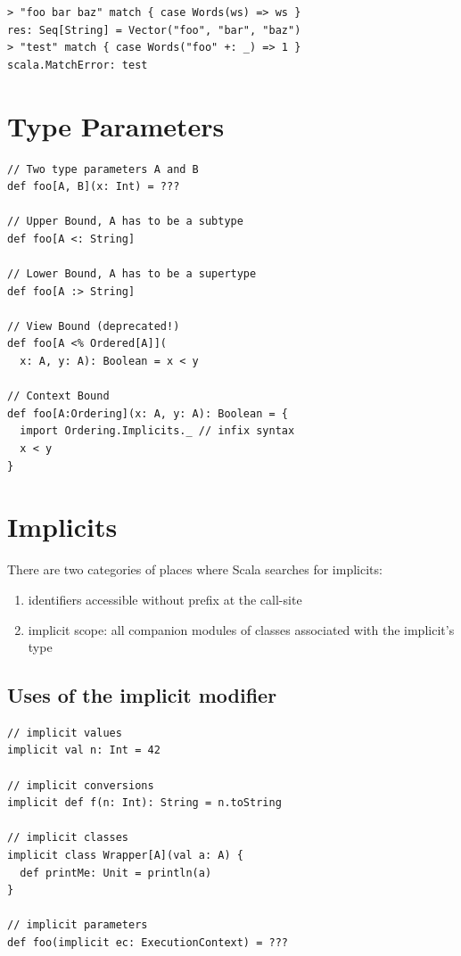 \documentclass[10pt,landscape,a4paper]{article}
\newcommand{\TODO}[2][]{\todo[inline,color=green!40,linecolor=green!50,#1]{\small TODO #2}}
\begin{document}
\begin{multicols*}{4}
\begin{verbatim}
> "foo bar baz" match { case Words(ws) => ws }
res: Seq[String] = Vector("foo", "bar", "baz")
> "test" match { case Words("foo" +: _) => 1 }
scala.MatchError: test
\end{verbatim}

  \section{Type Parameters}
  \TODO{}

\begin{verbatim}
// Two type parameters A and B
def foo[A, B](x: Int) = ???

// Upper Bound, A has to be a subtype
def foo[A <: String]

// Lower Bound, A has to be a supertype
def foo[A :> String]

// View Bound (deprecated!)
def foo[A <% Ordered[A]](
  x: A, y: A): Boolean = x < y

// Context Bound
def foo[A:Ordering](x: A, y: A): Boolean = {
  import Ordering.Implicits._ // infix syntax
  x < y
}
\end{verbatim}

    \section{Implicits}
  There are two categories of places where Scala searches for implicits:
  \begin{enumerate}
  \item identifiers accessible without prefix at the call-site
  \item implicit scope: all companion modules of classes associated
    with the implicit's type
  \end{enumerate}

  \subsection{Uses of the implicit modifier}

\begin{verbatim}
// implicit values
implicit val n: Int = 42

// implicit conversions
implicit def f(n: Int): String = n.toString

// implicit classes
implicit class Wrapper[A](val a: A) {
  def printMe: Unit = println(a)
}

// implicit parameters
def foo(implicit ec: ExecutionContext) = ???
\end{verbatim}


\end{multicols*}
\end{document}
